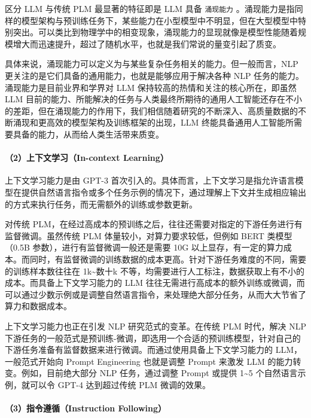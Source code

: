 \documentclass[12pt,a4paper]{book}
\begin{document}
区分 LLM 与传统 PLM 最显著的特征即是 LLM 具备 \texttt{涌现能力}
。涌现能力是指同样的模型架构与预训练任务下，某些能力在小型模型中不明显，但在大型模型中特别突出。可以类比到物理学中的相变现象，涌现能力的显现就像是模型性能随着规模增大而迅速提升，超过了随机水平，也就是我们常说的量变引起了质变。

具体来说，涌现能力可以定义为与某些复杂任务相关的能力。但一般而言，NLP
更关注的是它们具备的通用能力，也就是能够应用于解决各种 NLP
任务的能力。涌现能力是目前业界和学界对 LLM
保持较高的热情和关注的核心所在，即虽然 LLM
目前的能力、所能解决的任务与人类最终所期待的通用人工智能还存在不小的差距，但在涌现能力的作用下，我们相信随着研究的不断深入、高质量数据的不断涌现和更高效的模型架构及训练框架的出现，LLM
终能具备通用人工智能所需要具备的能力，从而给人类生活带来质变。

\paragraph{（2）上下文学习（In-context
Learning）}\label{ux4e0aux4e0bux6587ux5b66ux4e60in-context-learning}

上下文学习能力是由 GPT-3
首次引入的。具体而言，上下文学习是指允许语言模型在提供自然语言指令或多个任务示例的情况下，通过理解上下文并生成相应输出的方式来执行任务，而无需额外的训练或参数更新。

对传统
PLM，在经过高成本的预训练之后，往往还需要对指定的下游任务进行有监督微调。虽然传统
PLM 体量较小，对算力要求较低，但例如 BERT 类模型（0.5B
参数），进行有监督微调一般还是需要 10G
以上显存，有一定的算力成本。而同时，有监督微调的训练数据的成本更高。针对下游任务难度的不同，需要的训练样本数往往在
1k\textasciitilde 数十k
不等，均需要进行人工标注，数据获取上有不小的成本。而具备上下文学习能力的
LLM
往往无需进行高成本的额外训练或微调，而可以通过少数示例或是调整自然语言指令，来处理绝大部分任务，从而大大节省了算力和数据成本。

上下文学习能力也正在引发 NLP 研究范式的变革。在传统 PLM 时代，解决 NLP
下游任务的一般范式是预训练-微调，即选用一个合适的预训练模型，针对自己的下游任务准备有监督数据来进行微调。而通过使用具备上下文学习能力的
LLM，一般范式开始向 Prompt Engineering 也就是调整 Prompt 来激发 LLM
的能力转变。例如，目前绝大部分 NLP 任务，通过调整 Prompt 或提供
1\textasciitilde5 个自然语言示例，就可以令 GPT-4 达到超过传统 PLM
微调的效果。

\paragraph{（3）指令遵循（Instruction
Following）}\label{ux6307ux4ee4ux9075ux5faainstruction-following}
\end{document}
